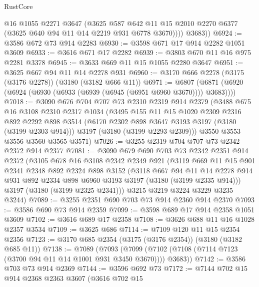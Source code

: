 \begin{lexlean}{RustCore}
\begin{coremodule}
            @16
            @1055
            @2271
            @3647
            (@3625
              @587
              @642
              @11
              @15
              @2010
              @2270
              @6377
              (@3625 @640 @94 @11 @14 @2219 @931 @6778 @3670))))
        @3683))
@6924 := @3586 @672 @73 @914 @2283
@6930 := @3598 @671 @17 @914 @2282 @1051 @3609
@6933 := @3616 @671 @17 @2282
@6939 := @3803 @670 @11 @16 @975 @2281 @3378
@6945 := @3633 @669 @11 @15 @1055 @2280 @3647
@6951 := @3625 @667 @94 @11 @14 @2278 @931
@6960 := @3170 @666 @2278 (@3175 (@3176 @2278)) (@3180 (@3182 @666 @11))
@6971 := @6807 (@6871 (@6920 (@6924 (@6930 (@6933 (@6939 (@6945 (@6951 @6960 @3670)))) @3683))))
@7018 := @3090
    @676
    @704
    @707
    @73
    @2310
    @2319
    @914
    @2379
    (@3488
      @675
      @16
      @3108
      @2310
      @2317
      @1034
      (@3495
        @155
        @11
        @15
        @1020
        @2309
        @2316
        @892
        @2292
        @898
        @3514
        (@6170 @2302 @898 @3647 @3193 @3197 (@3180 (@3199 @2303 @914)))
        @3197
        (@3180 (@3199 @2293 @2309)))
      @3550
      @3553
      @3556
      @3560
      @3565
      @3571)
@7026 := @3255 @2319 @704 @707 @73 @2342 @2372 @914 @2377
@7081 := @3090
    @679
    @690
    @703
    @73
    @2342
    @2351
    @914
    @2372
    (@3105
      @678
      @16
      @3108
      @2342
      @2349
      @921
      (@3119
        @669
        @11
        @15
        @901
        @2341
        @2348
        @892
        @2324
        @898
        @3152
        (@3118
          @667
          @94
          @11
          @14
          @2278
          @914
          @931
          @892
          @2334
          @898
          @6960
          @3193
          @3197
          (@3180 (@3199 @2335 @914)))
        @3197
        (@3180 (@3199 @2325 @2341)))
      @3215
      @3219
      @3224
      @3229
      @3235
      @3244)
@7089 := @3255 @2351 @690 @703 @73 @914 @2360 @914 @2370
@7093 := @3586 @690 @73 @914 @2359
@7099 := @3598 @689 @17 @914 @2358 @1051 @3609
@7102 := @3616 @689 @17 @2358
@7108 := @3626 @688 @11 @16 @1028 @2357 @3534
@7109 := @3625 @686
@7114 := @7109 @120 @11 @15 @2354 @2356
@7123 := @3170 @685 @2354 (@3175 (@3176 @2354)) (@3180 (@3182 @685 @11))
@7138 := @7089
    (@7093 (@7099 (@7102 (@7108 (@7114 @7123 (@3700 @94 @11 @14 @1001 @931 @3450 @3670)))) @3683))
@7142 := @3586 @703 @73 @914 @2369
@7144 := @3596 @692 @73
@7172 := @7144
    @702
    @15
    @914
    @2368
    @2363
    @3607
    (@3616
      @702
      @15

\end{coremodule}
\end{lexlean}
